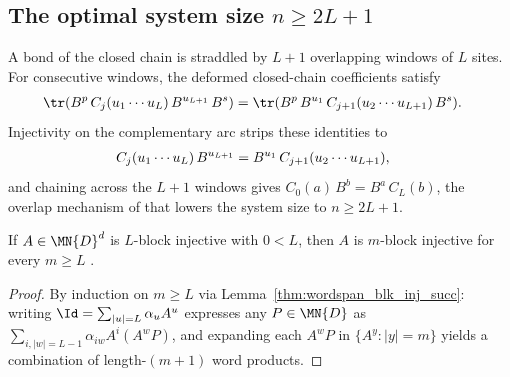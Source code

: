 \subsection{\texorpdfstring{The optimal system size $n \ge 2L + 1$}{The optimal system size n >= 2L+1}}

A bond of the closed chain is straddled by $L + 1$ overlapping windows of $L$
sites. For consecutive windows, the deformed closed-chain coefficients satisfy
\begin{align}
    \tr(B^{p}\, C_j(u_1 \cdots u_L)\, B^{u_{L+1}}\, B^{s})
     & =
    \tr(B^{p}\, B^{u_1}\, C_{j+1}(u_2 \cdots u_{L+1})\, B^{s}).
    \notag
\end{align}
Injectivity on the complementary arc strips these identities to
\begin{align}
    C_j(u_1 \cdots u_L)\,B^{u_{L+1}}
     & =
    B^{u_1}\,C_{j+1}(u_2 \cdots u_{L+1}),
    \notag
\end{align}
and chaining across the $L + 1$ windows gives $C_0(a)\,B^b = B^a\,C_L(b)$, the
overlap mechanism of \cite[Lemma~5]{Molnar2018NormalPEPS} that lowers the system
size to $n \ge 2L + 1$.

\begin{lemma}%
    \label{lem:isNBlkInjective_of_le}
    \leanok
    If $A\in\MN{D}^d$ is $L$-block injective with $0 < L$, then $A$ is $m$-block
    injective for every $m \ge L$
    \cite[Section~``Normal MPS: alternative proof'']{Molnar2018NormalPEPS}.
\end{lemma}
\begin{proof}\leanok
    By induction on $m\ge L$ via Lemma~\ref{thm:wordspan_blk_inj_succ}: writing
    $\Id=\sum_{|u|=L}\alpha_u A^u$ expresses any $P\in\MN{D}$ as
    $\sum_{i,|w|=L-1}\alpha_{iw} A^i(A^w P)$, and expanding each $A^w P$ in
    $\{A^y:|y|=m\}$ yields a combination of length-$(m+1)$ word products.
\end{proof}

